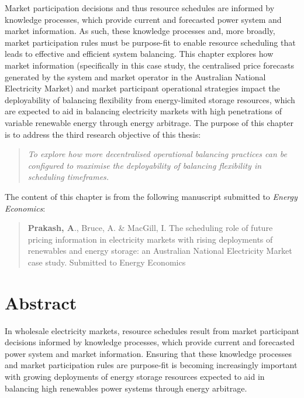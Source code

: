 \documentclass[12pt,a4paper,]{report}
\begin{document}
Market participation decisions and thus resource schedules are informed
by knowledge processes, which provide current and forecasted power
system and market information. As such, these knowledge processes and,
more broadly, market participation rules must be purpose-fit to enable
resource scheduling that leads to effective and efficient system
balancing. This chapter explores how market information (specifically in
this case study, the centralised price forecasts generated by the system
and market operator in the Australian National Electricity Market) and
market participant operational strategies impact the deployability of
balancing flexibility from energy-limited storage resources, which are
expected to aid in balancing electricity markets with high penetrations
of variable renewable energy through energy arbitrage. The purpose of
this chapter is to address the third research objective of this thesis:

\begin{quote}
\emph{To explore how more decentralised operational balancing practices
can be configured to maximise the deployability of balancing flexibility
in scheduling timeframes.}
\end{quote}

The content of this chapter is from the following manuscript submitted
to \emph{Energy Economics}:

\begin{quote}
\textbf{Prakash, A}., Bruce, A. \& MacGill, I. The scheduling role of
future pricing information in electricity markets with rising
deployments of renewables and energy storage: an Australian National
Electricity Market case study. Submitted to Energy Economics
\end{quote}

\hypertarget{abstract-3}{%
\section{Abstract}\label{abstract-3}}

In wholesale electricity markets, resource schedules result from market
participant decisions informed by knowledge processes, which provide
current and forecasted power system and market information. Ensuring
that these knowledge processes and market participation rules are
purpose-fit is becoming increasingly important with growing deployments
of energy storage resources expected to aid in balancing high renewables
power systems through energy arbitrage.
\end{document}
